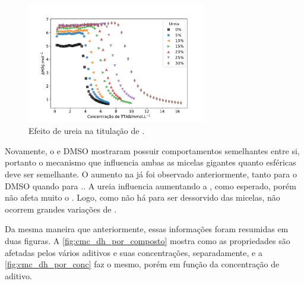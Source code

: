 			
			\begin{figure}[h]
				\centering
				\includegraphics[width=0.7\textwidth]{imagens/itc/ITC_ur}
				\caption{Efeito de ureia na titulação de \TTAB.}
				\label{fig:itc_ureia}
			\end{figure} 
		
		Novamente, o \BD{} e DMSO mostraram possuir comportamentos semelhantes entre si, portanto o mecanismo que influencia ambas as micelas gigantes quanto esféricas deve ser semelhante. O aumento na \cmc{} já foi observado anteriormente, tanto para o DMSO\cite{Bakshi1993a} quando para \BD.\cite{Abdel-Rahem2012}. A ureia influencia aumentando a \cmc{}, como esperado,\cite{Dias2002} porém não afeta muito o \DHmic{}. Logo, como não há \Sal{} para ser dessorvido das micelas, não ocorrem grandes variações de \DHmic.
		
		Da mesma maneira que anteriormente, essas informações foram resumidas em duas figuras. A \autoref{fig:cmc_dh_por_composto} mostra como as propriedades são afetadas pelos vários aditivos e suas concentrações, separadamente, e a \autoref{fig:cmc_dh_por_conc} faz o mesmo, porém em função da concentração de aditivo.
		
